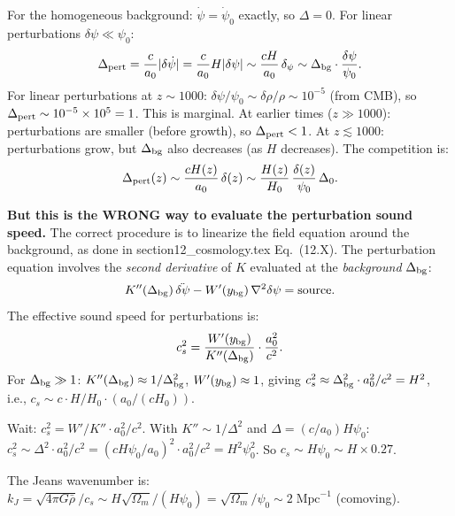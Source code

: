 \documentclass[11pt]{article}
\begin{document}
\begin{tcolorbox}[colback=red!5!white, colframe=red!70!black,
  title=\textbf{W4i17 TOP 5 FINDINGS --- EXISTENTIAL AUDIT: DUST BRANCH CLUSTERING}]
\begin{enumerate}
  For the homogeneous background: $\dot\psi = \dot\psi_0$ exactly,
  so $\Delta = 0$. For linear perturbations $\delta\psi \ll \psi_0$:
  \begin{equation}
  \Delta_{\rm pert} = \frac{c}{a_0}|\delta\dot\psi|
  = \frac{c}{a_0} H |\delta\psi| \sim \frac{c H}{a_0}\,\delta_\psi
  \sim \Delta_{\rm bg} \cdot \frac{\delta\psi}{\psi_0}.
  \end{equation}
  For linear perturbations at $z \sim 1000$: $\delta\psi/\psi_0 \sim
  \delta\rho/\rho \sim 10^{-5}$ (from CMB), so
  $\Delta_{\rm pert} \sim 10^{-5} \times 10^5 = 1$.
  This is marginal. At earlier times ($z \gg 1000$): perturbations
  are smaller (before growth), so $\Delta_{\rm pert} < 1$.
  At $z \lesssim 1000$: perturbations grow, but $\Delta_{\rm bg}$
  also decreases (as $H$ decreases). The competition is:
  \begin{equation}
  \Delta_{\rm pert}(z) \sim \frac{c H(z)}{a_0}\,\delta(z)
  \sim \frac{H(z)}{H_0}\,\frac{\delta(z)}{\psi_0}\,\Delta_0.
  \end{equation}

  \textbf{But this is the WRONG way to evaluate the perturbation
  sound speed.} The correct procedure is to linearize the
  field equation around the background, as done in
  section12\_cosmology.tex Eq.~(12.X). The perturbation equation
  involves the \emph{second derivative} of $K$ evaluated at the
  \emph{background} $\Delta_{\rm bg}$:
  \begin{equation}
  K''(\Delta_{\rm bg})\,\ddot{\delta\psi}
  - W'(y_{\rm bg})\,\nabla^2\delta\psi = \text{source}.
  \end{equation}
  The effective sound speed for perturbations is:
  \begin{equation}
  c_s^2 = \frac{W'(y_{\rm bg})}{K''(\Delta_{\rm bg})}
  \cdot \frac{a_0^2}{c^2}.
  \end{equation}
  For $\Delta_{\rm bg} \gg 1$: $K''(\Delta_{\rm bg}) \approx
  1/\Delta_{\rm bg}^2$, $W'(y_{\rm bg}) \approx 1$, giving
  $c_s^2 \approx \Delta_{\rm bg}^2 \cdot a_0^2/c^2 = H^2$,
  i.e., $c_s \sim c \cdot H/H_0 \cdot (a_0/(cH_0))$.

  Wait: $c_s^2 = W' / K'' \cdot a_0^2/c^2$. With $K'' \sim
  1/\Delta^2$ and $\Delta = (c/a_0) H \psi_0$:
  $c_s^2 \sim \Delta^2 \cdot a_0^2/c^2 = (c H \psi_0 / a_0)^2
  \cdot a_0^2/c^2 = H^2 \psi_0^2$.
  So $c_s \sim H \psi_0 \sim H \times 0.27$.

  The Jeans wavenumber is:
  $k_J = \sqrt{4\pi G \bar\rho} / c_s \sim H\sqrt{\Omega_m} / (H\psi_0)
  = \sqrt{\Omega_m}/\psi_0 \sim 2\;\text{Mpc}^{-1}$ (comoving).


\end{enumerate}
\end{tcolorbox}
\end{document}
